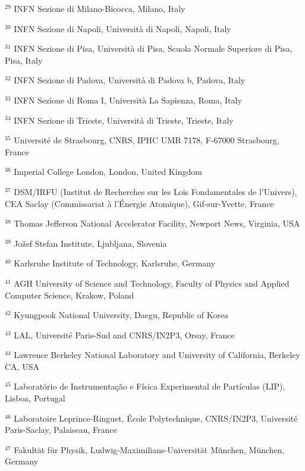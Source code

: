 \par {\footnotesize $^{29}$ INFN Sezione di Milano-Bicocca, Milano, Italy}
\par {\footnotesize $^{30}$ INFN Sezione di Napoli, Università di Napoli, Napoli, Italy}
\par {\footnotesize $^{31}$ INFN Sezione di Pisa, Università di Pisa, Scuola Normale Superiore di Pisa, Pisa, Italy}
\par {\footnotesize $^{32}$ INFN Sezione di Padova, Università di Padova b, Padova, Italy}
\par {\footnotesize $^{33}$ INFN Sezione di Roma I, Università La Sapienza, Roma, Italy}
\par {\footnotesize $^{34}$ INFN Sezione di Trieste, Università di Trieste, Trieste, Italy}
\par {\footnotesize $^{35}$ Université de Strasbourg, CNRS, IPHC UMR 7178, F-67000 Strasbourg, France}
\par {\footnotesize $^{36}$ Imperial College London, London, United Kingdom}
\par {\footnotesize $^{37}$ DSM/IRFU (Institut de Recherches sur les Lois Fondamentales de l’Univers), CEA Saclay (Commissariat à l’Énergie Atomique), Gif-sur-Yvette, France}
\par {\footnotesize $^{38}$ Thomas Jefferson National Accelerator Facility, Newport News, Virginia, USA}
\par {\footnotesize $^{39}$ Jožef Stefan Institute, Ljubljana, Slovenia}
\par {\footnotesize $^{40}$ Karlsruhe Institute of Technology, Karlsruhe, Germany}
\par {\footnotesize $^{41}$ AGH University of Science and Technology, Faculty of Physics and Applied Computer Science, Krakow, Poland}
\par {\footnotesize $^{42}$ Kyungpook National University, Daegu, Republic of Korea}
\par {\footnotesize $^{43}$ LAL, Université Paris-Sud and CNRS/IN2P3, Orsay, France}
\par {\footnotesize $^{44}$ Lawrence Berkeley National Laboratory and University of California, Berkeley CA, USA}
\par {\footnotesize $^{45}$ Laboratório de Instrumentação e Física Experimental de Partículas (LIP), Lisboa, Portugal}
\par {\footnotesize $^{46}$ Laboratoire Leprince-Ringuet, École Polytechnique, CNRS/IN2P3, Université Paris-Saclay, Palaiseau, France}
\par {\footnotesize $^{47}$ Fakultät für Physik, Ludwig-Maximilians-Universität München, München, Germany}

